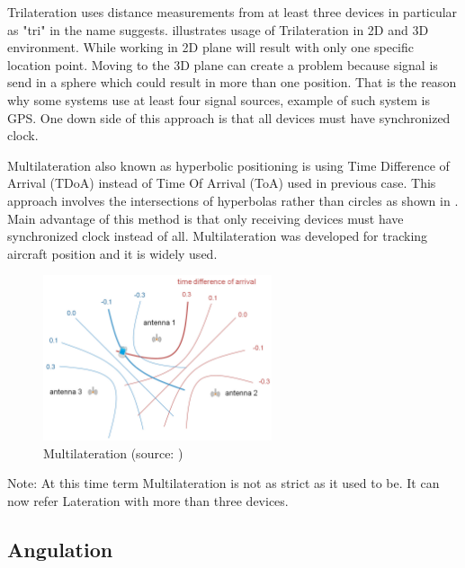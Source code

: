 Trilateration uses distance measurements from at least three devices in particular as "tri" in the name suggests.\cite{RAinWILTaS}  illustrates usage of Trilateration in 2D and 3D environment. While working in 2D plane will result with only one specific location point. Moving to the 3D plane can create a problem because signal is send in a sphere which could result in more than one position. That is the reason why some systems use at least four signal sources, example of such system is GPS.\cite{GNSSGPS} One down side of this approach is that all devices must have synchronized clock.\cite{RAinWILTaS}

Multilateration also known as hyperbolic positioning is using Time Difference of Arrival (TDoA) instead of Time Of Arrival (ToA) used in previous case. This approach involves the intersections of hyperbolas rather than circles as shown in . Main advantage of this method is that only receiving devices must have synchronized clock instead of all.\cite{PLTaA} Multilateration was developed for tracking aircraft position and it is widely used.

\begin{figure}[h!]
	\begin{centering}
		\includegraphics[width=0.6\textwidth]{img/multilateration}
		\par\end{centering}
	\caption{Multilateration (source: \cite{HPwAA})\label{fig:Multilateration}}
	\label{fig3}
\end{figure}

Note: At this time term Multilateration is not as strict as it used to be. It can now refer Lateration with more than three devices.

\subsection{Angulation}\label{sec:Angulation}

